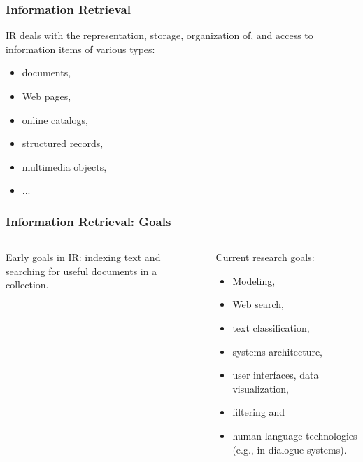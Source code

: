 \documentclass[svgnames]{beamer}
\begin{document}

\begin{frame}
  \frametitle{Information Retrieval}

\begin{block}{}

IR deals with the representation, storage, organization of, and
  access to information items of various types:

\begin{itemize} 
    \item documents, 
    \item Web pages,
    \item online catalogs, 
    \item structured records,
    \item multimedia objects,
    \item ...
\end{itemize}

\end{block}

\end{frame}


\begin{frame}
  \frametitle{Information Retrieval: Goals}

  \begin{columns}[t]


    \begin{block}{Early goals in IR:} indexing text and
      searching for useful documents in a collection. 
    \end{block}


    \begin{block}{Current research goals:}
      \begin{itemize} 
      \item Modeling, 
      \item Web search,
      \item text classification, 
      \item systems architecture, 
      \item user interfaces, data visualization, 
      \item filtering and
      \item human language technologies (e.g., in dialogue systems).
     \end{itemize}
\end{block}

\end{columns}

\end{frame}
\end{document}
